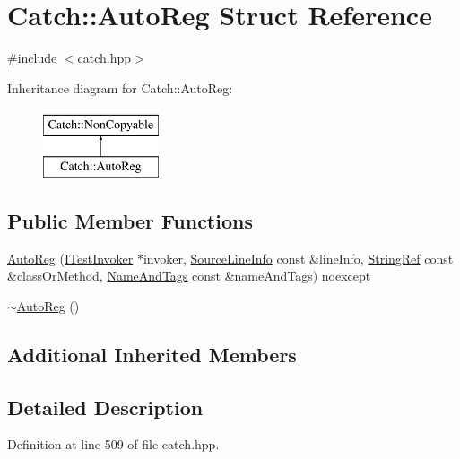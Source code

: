 \hypertarget{struct_catch_1_1_auto_reg}{}\section{Catch\+:\+:Auto\+Reg Struct Reference}
\label{struct_catch_1_1_auto_reg}


{\ttfamily \#include $<$catch.\+hpp$>$}

Inheritance diagram for Catch\+:\+:Auto\+Reg\+:\begin{figure}[H]
\begin{center}
\leavevmode
\includegraphics[height=2.000000cm]{struct_catch_1_1_auto_reg}
\end{center}
\end{figure}
\subsection*{Public Member Functions}
\begin{DoxyCompactItemize}
\item 
\mbox{\hyperlink{struct_catch_1_1_auto_reg_a7eba02fb9d80b9896bf5a6517369af28}{Auto\+Reg}} (\mbox{\hyperlink{struct_catch_1_1_i_test_invoker}{I\+Test\+Invoker}} $\ast$invoker, \mbox{\hyperlink{struct_catch_1_1_source_line_info}{Source\+Line\+Info}} const \&line\+Info, \mbox{\hyperlink{class_catch_1_1_string_ref}{String\+Ref}} const \&class\+Or\+Method, \mbox{\hyperlink{struct_catch_1_1_name_and_tags}{Name\+And\+Tags}} const \&name\+And\+Tags) noexcept
\item 
\mbox{\hyperlink{struct_catch_1_1_auto_reg_a3cdb53f1e5ff115310f3372bebe198f1}{$\sim$\+Auto\+Reg}} ()
\end{DoxyCompactItemize}
\subsection*{Additional Inherited Members}


\subsection{Detailed Description}


Definition at line 509 of file catch.\+hpp.



